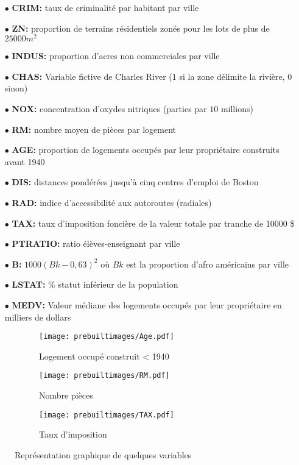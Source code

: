 \begin{itemize}
    \item[$\bullet$] \textbf{CRIM:} taux de criminalité par habitant par ville
    \item[$\bullet$] \textbf{ZN:} proportion de terrains résidentiels zonés pour les lots de plus de $25 000 m^2$
    \item[$\bullet$] \textbf{INDUS:} proportion d'acres non commerciales par ville
    \item[$\bullet$] \textbf{CHAS:} Variable fictive de Charles River ($1$ si la zone délimite la rivière, $0$ sinon)
    \item[$\bullet$] \textbf{NOX:} concentration d'oxydes nitriques (parties par $10$ millions)
    \item[$\bullet$] \textbf{RM:} nombre moyen de pièces par logement
    \item[$\bullet$] \textbf{AGE:} proportion de logements occupés par leur propriétaire construits avant 1940
    \item[$\bullet$] \textbf{DIS:} distances pondérées jusqu'à cinq centres d'emploi de Boston
    \item[$\bullet$] \textbf{RAD:} indice d'accessibilité aux autoroutes (radiales)
    \item[$\bullet$] \textbf{TAX:} taux d'imposition foncière de la valeur totale par tranche de 10000 \$
    \item[$\bullet$] \textbf{PTRATIO:} ratio élèves-enseignant par ville
    \item[$\bullet$] \textbf{B:} $1000 (Bk - 0,63) ^ 2$ où $Bk$ est la proportion d'afro américains par ville
    \item[$\bullet$] \textbf{LSTAT:} \% statut inférieur de la population
    \item[$\bullet$] \textbf{MEDV:} Valeur médiane des logements occupés par leur propriétaire en milliers de dollars
\end{itemize}

\begin{figure}[H]
  \centering
  \begin{subfigure}{.3\linewidth}
    \centering
    \texttt{[image: prebuiltimages/Age.pdf]}
    \caption{Logement occupé construit < 1940}
  \end{subfigure}%
  \hspace{1em}%
  \begin{subfigure}{.3\linewidth}
    \centering
    \texttt{[image: prebuiltimages/RM.pdf]}
    \caption{Nombre pièces}
  \end{subfigure}%
  \hspace{2em}%
  \begin{subfigure}{.3\linewidth}
    \centering
    \texttt{[image: prebuiltimages/TAX.pdf]}
    \caption{Taux d'imposition}
  \end{subfigure}
  \caption{Représentation graphique de quelques variables}
\end{figure}


